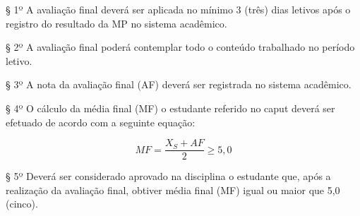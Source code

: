 {§ 1º A avaliação final deverá ser aplicada no mínimo 3 (três) dias letivos após o registro do resultado da MP no sistema acadêmico.

§ 2º A avaliação final poderá contemplar todo o conteúdo trabalhado no período letivo.

§ 3º A nota da avaliação final (AF) deverá ser registrada no sistema acadêmico.

§ 4º O cálculo da média final (MF) o estudante referido no caput deverá ser efetuado de acordo com a seguinte equação:

\begin{equation*}
	MF=\frac{X_S+AF}{2}\geq 5,0
\end{equation*}
\vspace{0,3cm}

§ 5º Deverá ser considerado aprovado na disciplina o estudante que, após a realização da avaliação final, obtiver média final (MF) igual ou maior que 5,0 (cinco).
}
